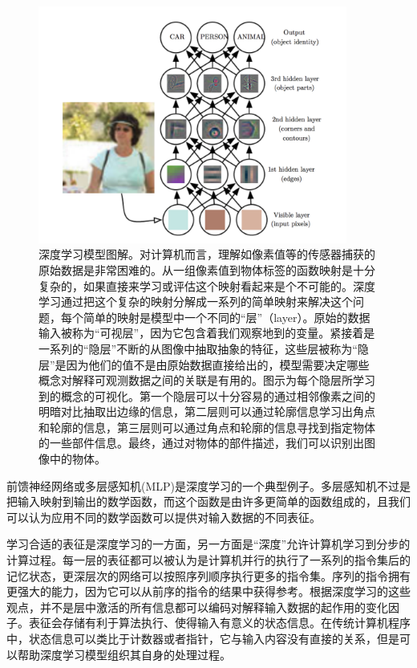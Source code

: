 \documentclass[a4paper,11pt]{book}
\begin{document}
\begin{figure}[htbp] %
   \centering
   \includegraphics[width=4in]{fig/chap1/deep_learning_intro.png} 
   \caption{深度学习模型图解。对计算机而言，理解如像素值等的传感器捕获的原始数据是非常困难的。从一组像素值到物体标签的函数映射是十分复杂的，如果直接来学习或评估这个映射看起来是个不可能的。深度学习通过把这个复杂的映射分解成一系列的简单映射来解决这个问题，每个简单的映射是模型中一个不同的“层”（layer）。原始的数据输入被称为“可视层”，因为它包含着我们观察地到的变量。紧接着是一系列的“隐层”不断的从图像中抽取抽象的特征，这些层被称为“隐层”是因为他们的值不是由原始数据直接给出的，模型需要决定哪些概念对解释可观测数据之间的关联是有用的。图示为每个隐层所学习到的概念的可视化。第一个隐层可以十分容易的通过相邻像素之间的明暗对比抽取出边缘的信息，第二层则可以通过轮廓信息学习出角点和轮廓的信息，第三层则可以通过角点和轮廓的信息寻找到指定物体的一些部件信息。最终，通过对物体的部件描述，我们可以识别出图像中的物体。}
   \label{fig:deep_learning_intro}
\end{figure}


前馈神经网络或多层感知机(MLP)是深度学习的一个典型例子。多层感知机不过是把输入映射到输出的数学函数，而这个函数是由许多更简单的函数组成的，且我们可以认为应用不同的数学函数可以提供对输入数据的不同表征。


学习合适的表征是深度学习的一方面，另一方面是“深度”允许计算机学习到分步的计算过程。每一层的表征都可以被认为是计算机并行的执行了一系列的指令集后的记忆状态，更深层次的网络可以按照序列顺序执行更多的指令集。序列的指令拥有更强大的能力，因为它可以从前序的指令的结果中获得参考。根据深度学习的这些观点，并不是层中激活的所有信息都可以编码对解释输入数据的起作用的变化因子。表征会存储有利于算法执行、使得输入有意义的状态信息。在传统计算机程序中，状态信息可以类比于计数器或者指针，它与输入内容没有直接的关系，但是可以帮助深度学习模型组织其自身的处理过程。
\end{document}

